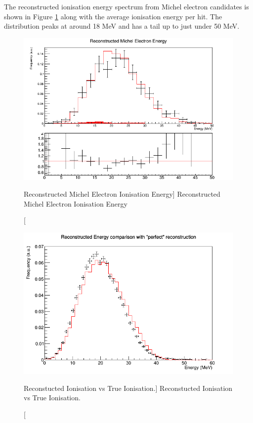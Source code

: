 The reconstructed ionisation energy spectrum from Michel electron candidates is
shown in Figure \ref{fig:michel_ion_reco} along with the average ionisation
energy per hit. The distribution peaks at around 18 MeV and has a tail up to 
just under 50 MeV.
\begin{figure}
	\centering
	\includegraphics[width=\textwidth]{figures/michel_ion_reco.png}
	\caption
	[Reconstructed Michel Electron Ionisation Energy]
	{Reconstructed Michel Electron Ionisation Energy}
	\label{fig:michel_ion_reco}
\end{figure}


\begin{figure}
	\centering
	\includegraphics[width=\textwidth, height=0.68\textwidth]{figures/reco_v_ion.png}
	\caption
	[Reconstucted Ionisation vs True Ionisation.]
	{Reconstucted Ionisation vs True Ionisation.}
	\label{fig:reco_v_ion}
\end{figure}

